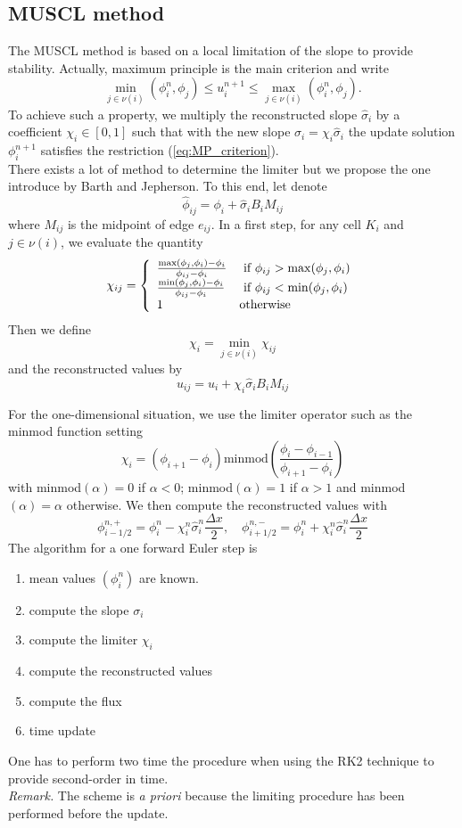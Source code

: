 \subsection{MUSCL method}
\label{sec:410}
The MUSCL method is based on a local limitation of the slope to provide stability.
Actually, maximum principle is the main criterion and write
\begin{equation}
\min_{j\in \nu(i)}(\phi^n_i,\phi_j)\leq u^{n+1}_i \leq \max_{j\in \nu(i)}(\phi^n_i,\phi_j).
\label{eq:MP_criterion}
\end{equation}
To achieve such a property, we multiply the reconstructed slope $\widehat \sigma_i$ by a
coefficient $\chi_i\in[0,1]$ such that with the new slope $\sigma_i=\chi_i\widehat \sigma_i$
the update solution $\phi^{n+1}_i$ satisfies the restriction (\ref{eq:MP_criterion}).\\
There exists a lot of method to determine the limiter but we propose the one introduce
by Barth and Jepherson. To this end, let denote 
$$
\widehat \phi_{ij}=\phi_i+\widehat \sigma_i B_iM_{ij}
$$
where $M_{ij}$ is the midpoint of edge $e_{ij}$. In a first step, 
for any cell $K_i$ and $j\in\nu(i)$, we evaluate the quantity
$$
\chi_{ij} = \left\{\begin{array}{l l}
\frac{\max(\phi_j,\phi_i)-\phi_i}{\phi_{ij}-\phi_i} & \textrm{ if } \phi_{ij}> \max(\phi_j,\phi_i) \\
\frac{\min(\phi_j,\phi_i)-\phi_i}{\phi_{ij}-\phi_i}  &\textrm{ if } \phi_{ij} <\min(\phi_j,\phi_i) \\
1 & \text{otherwise}
\end{array}\right.
$$
Then we define 
$$
\chi_i=\min_{j\in\nu(i)} \chi_{ij}
$$
and the reconstructed values by
$$
u_{ij} = u_i + \chi_i\widehat \sigma_i  B_i M_{ij}
$$


For the one-dimensional situation, we use the limiter operator such as the minmod function
setting
$$
\chi_i=(\phi_{i+1}-\phi_{i})\text{minmod}\left (\frac{\phi_{i}-\phi_{i-1}}{\phi_{i+1}-\phi_{i}}\right ) 
$$
with minmod$(\alpha)=0$ if $\alpha<0$;  minmod$(\alpha)=1$ if $\alpha>1$ and minmod$(\alpha)=\alpha$
otherwise.
We then compute the reconstructed values with
$$
\phi_{i-1/2}^{n,+}=\phi_i^n-\chi_i^n \widehat \sigma_i^n \frac{\Delta x}{2},\quad
\phi_{i+1/2}^{n,-}=\phi_i^n+\chi_i^n \widehat \sigma_i^n \frac{\Delta x}{2}
$$
The algorithm for a one forward Euler step is
\begin{enumerate}
\item mean values $(\phi^n_i)$ are known.
\item compute the slope $\sigma_i$
\item compute the limiter $\chi_i$
\item compute the reconstructed values
\item compute the flux
\item time update 
\end{enumerate}
One has to perform two time the procedure when using the RK2 technique to provide
second-order in time.\\
{\it Remark.} The scheme is {\it a priori} because the limiting procedure has been performed before
the update.  
 